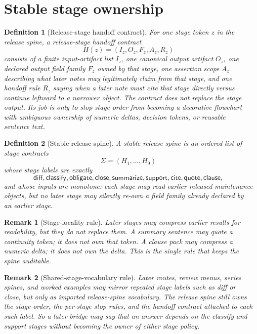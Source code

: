 \documentclass[11pt]{article}
\newtheorem{definition}{Definition}
\newtheorem{remark}{Remark}
\begin{document}
\section{Stable stage ownership}

\begin{definition}[Release-stage handoff contract]
For one stage token $z$ in the release spine, a \emph{release-stage handoff contract}
\[
H(z)=(I_z,O_z,F_z,A_z,R_z)
\]
consists of a finite input-artifact list $I_z$, one canonical output artifact $O_z$, one declared output field family $F_z$ owned by that stage, one assertion scope $A_z$ describing what later notes may legitimately claim from that stage, and one handoff rule $R_z$ saying when a later note must cite that stage directly versus continue leftward to a narrower object.
The contract does not replace the stage output.
Its job is only to stop stage order from becoming a decorative flowchart with ambiguous ownership of numeric deltas, decision tokens, or reusable sentence text.
\end{definition}

\begin{definition}[Stable release spine]
A \emph{stable release spine} is an ordered list of stage contracts
\[
\Sigma=(H_1,\dots,H_9)
\]
whose stage labels are exactly
\[
\textsf{diff},\textsf{classify},\textsf{obligate},\textsf{close},\textsf{summarize},\textsf{support},\textsf{cite},\textsf{quote},\textsf{clause},
\]
and whose inputs are monotone: each stage may read earlier released maintenance objects, but no later stage may silently re-own a field family already declared by an earlier stage.
\end{definition}

\begin{remark}[Stage-locality rule]
Later stages may compress earlier results for readability, but they do not replace them.
A summary sentence may quote a continuity token; it does not own that token.
A clause pack may compress a numeric delta; it does not own the delta.
This is the single rule that keeps the spine auditable.
\end{remark}

\begin{remark}[Shared-stage-vocabulary rule]
Later routes, review menus, series spines, and worked examples may mirror repeated stage labels such as \textsf{diff} or \textsf{close}, but only as imported release-spine vocabulary.
The release spine still owns the stage order, the per-stage stop rules, and the handoff contract attached to each such label.
So a later bridge may say that an answer depends on the \textsf{classify} and \textsf{support} stages without becoming the owner of either stage policy.
\end{remark}
\end{document}
